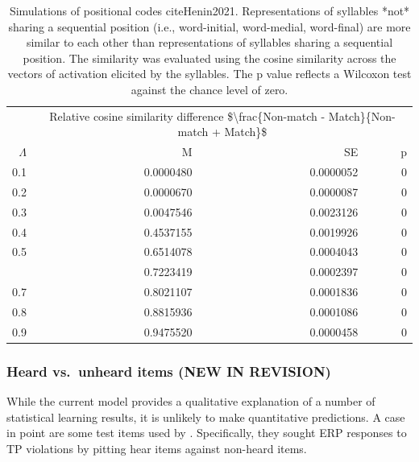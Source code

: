 \documentclass[
]{article}
\begin{document}
\begin{table}

\caption{\label{tab:basic-similarity-by-position-print-difference2}Simulations of positional codes cite{Henin2021}. Representations of syllables *not* sharing a sequential position (i.e., word-initial, word-medial, word-final) are more similar to each other than representations of syllables sharing a sequential position. The similarity was evaluated using the cosine similarity across the vectors of activation elicited by the syllables. The p value reflects a Wilcoxon test against the chance level of zero.}
\centering
\begin{tabular}[t]{rrrr}
\toprule
\multicolumn{1}{c}{ } & \multicolumn{3}{c}{Relative cosine similarity difference \$\textbackslash{}frac\{Non-match - Match\}\{Non-match + Match\}\$} \\
\cmidrule(l{3pt}r{3pt}){2-4}
$\Lambda$ & M & SE & p\\
\midrule
0.1 & 0.0000480 & 0.0000052 & 0\\
0.2 & 0.0000670 & 0.0000087 & 0\\
0.3 & 0.0047546 & 0.0023126 & 0\\
0.4 & 0.4537155 & 0.0019926 & 0\\
0.5 & 0.6514078 & 0.0004043 & 0\\
\addlinespace
0.6 & 0.7223419 & 0.0002397 & 0\\
0.7 & 0.8021107 & 0.0001836 & 0\\
0.8 & 0.8815936 & 0.0001086 & 0\\
0.9 & 0.9475520 & 0.0000458 & 0\\
\bottomrule
\end{tabular}
\end{table}

\hypertarget{heard-vs.-unheard-items-flo2022-new-in-revision}{%
\subsubsection{\texorpdfstring{Heard vs.~unheard items \citep{Flo2022}
(NEW IN
REVISION)}{Heard vs.~unheard items {[}@Flo2022{]} (NEW IN REVISION)}}\label{heard-vs.-unheard-items-flo2022-new-in-revision}}

While the current model provides a qualitative explanation of a number
of statistical learning results, it is unlikely to make quantitative
predictions. A case in point are some test items used by
\citep{Flo2022}. Specifically, they sought ERP responses to TP
violations by pitting hear items against non-heard items.
\end{document}
